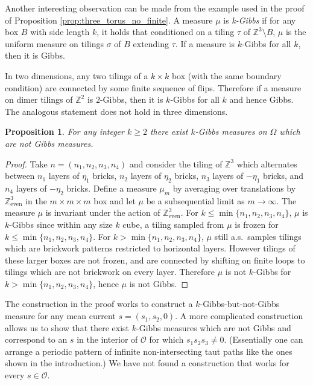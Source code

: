 \documentclass[11pt]{article}
\newtheorem{prop}[thm]{Proposition}
\theoremstyle{remark}
\theoremstyle{definition}
\newcommand{\Z}{\mathbb{Z}}
\newcommand{\threeeven}{\Z^3_{\text{even}}}
\newcommand{\m}[1]{\mathbb{#1}}
\begin{document}
Another interesting observation can be made from the example used in the proof of Proposition \ref{prop:three_torus_no_finite}. A measure $\mu$ is \textit{k-Gibbs} if for any box $B$ with side length $k$, it holds that conditioned on a tiling $\tau$ of $\m Z^3\setminus B$, $\mu$ is the uniform measure on tilings $\sigma$ of $B$ extending $\tau$. If a measure is $k$-Gibbs for all $k$, then it is Gibbs. 

In two dimensions, any two tilings of a $k\times k$ box (with the same boundary condition) are connected by some finite sequence of flips. Therefore if a measure on dimer tilings of $\m Z^2$ is $2$-Gibbs, then it is $k$-Gibbs for all $k$ and hence Gibbs. The analogous statement does not hold in three dimensions.

\begin{prop}\label{prop: k gibbs fails} For any integer $k \geq 2$ there exist $k$-Gibbs measures on $\Omega$ which are not Gibbs measures. 
\end{prop}
\begin{proof}
    Take $n = (n_1,n_2,n_3,n_4)$ and consider the tiling of $\m Z^3$ which alternates between $n_1$ layers of $\eta_1$ bricks, $n_2$ layers of $\eta_2$ bricks, $n_3$ layers of $-\eta_1$ bricks, and $n_4$ layers of $-\eta_2$ bricks. Define a measure $\mu_m$ by averaging over translations by $\threeeven$ in the $m\times m\times m$ box and let $\mu$ be a subsequential limit as $m\to \infty$. The measure $\mu$ is invariant under the action of $\threeeven$. For $k\leq \min\{n_1,n_2,n_3,n_4\}$, $\mu$ is $k$-Gibbs since within any size $k$ cube, a tiling sampled from $\mu$ is frozen for $k\leq \min\{n_1,n_2,n_3,n_4\}$. For $k > \min\{n_1,n_2,n_3,n_4\}$, $\mu$ still a.s.\ samples tilings which are brickwork patterns restricted to horizontal layers. However tilings of these larger boxes are not frozen, and are connected by shifting on finite loops to tilings which are not brickwork on every layer. Therefore $\mu$ is not $k$-Gibbs for $k > \min\{n_1,n_2,n_3,n_4\}$, hence $\mu$ is not Gibbs.
\end{proof}

The construction in the proof works to construct a $k$-Gibbs-but-not-Gibbs measure for any mean current $s=(s_1,s_2,0)$. A more complicated construction allows us to show that there exist $k$-Gibbs measures which are not Gibbs and correspond to an $s$ in the interior of $\mathcal O$ for which $s_1 s_2 s_3 \neq 0$. (Essentially one can arrange a periodic pattern of infinite non-intersecting taut paths like the ones shown in the introduction.) We have not found a construction that works for every $s \in \mathcal O$.
\end{document}
